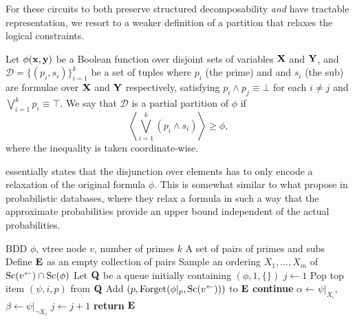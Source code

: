 For these circuits to both preserve structured decomposability \emph{and} have tractable
representation, we resort to a weaker definition of a partition that relaxes the logical
constraints.

\begin{definition}\label{def:partialpart}
  Let $\phi(\mathbf{x},\mathbf{y})$ be a Boolean function over disjoint sets of variables $\mathbf{X}$ and
  $\mathbf{Y}$, and $\mathcal{D}=\{(p_i,s_i)\}_{i=1}^k$ be a set of tuples where $p_i$ (the prime) and
  and $s_i$ (the sub) are formulae over $\mathbf{X}$ and $\mathbf{Y}$ respectively, satisfying $p_i\wedge
  p_j\equiv\bot$ for each $i\neq j$ and $\bigvee_{i=1}^k p_i\equiv\top$. We say that $\mathcal{D}$
  is a partial partition of $\phi$ if
  \begin{equation}
    \left\langle\bigvee_{i=1}^k (p_i\wedge s_i)\right\rangle\geq\phi,
  \end{equation}
  where the inequality is taken coordinate-wise.
\end{definition}

 essentially states that the disjunction over elements has to only encode a
relaxation of the original formula $\phi$. This is somewhat similar to what \citet{gatterbauer14}
propose in probabilistic databases, where they relax a formula in such a way that the approximate
probabilities provide an upper bound independent of the actual probabilities.

\begin{algorithm}[t]
  \caption{}\label{alg:samplepartial}
  \begin{algorithmic}[1]
    \Require BDD $\phi$, vtree node $v$, number of primes $k$
    \Ensure A set of pairs of primes and subs
    \State Define $\mathbf{E}$ as an empty collection of pairs
    \State Sample an ordering $X_1,\ldots,X_m$ of $\operatorname*{\normalfont{Sc}}(v^\gets)\cap\operatorname*{\normalfont{Sc}}(\phi)$
    \State Let $\mathbf{Q}$ be a queue initially containing $(\phi,1,\{\})$
    \State $j\gets 1$
    \label{alg:samplepartial:line:while}
      \State Pop top item $(\psi,i,p)$ from $\mathbf{Q}$
        \State Add $(p,\operatorname{\normalfont{Forget}}(\phi|_p,\operatorname*{\normalfont{Sc}}(v^\gets)))$ to $\mathbf{E}$
        \State \textbf{continue}
      \EndIf
      \State $\alpha\gets\psi|_{X_i}$, $\beta\gets\psi|_{\neg X_i}$
      \NIElse
        \State $j\gets j+1$
      \EndNIElse
    \EndWhile
    \State \textbf{return} $\mathbf{E}$
  \end{algorithmic}
\end{algorithm}

